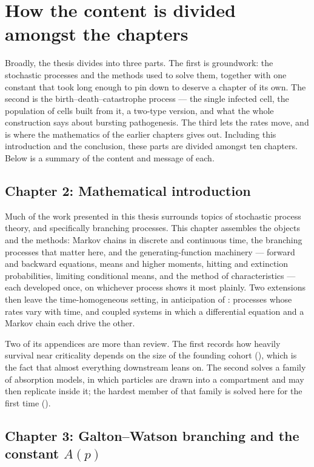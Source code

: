 \section{How the content is divided amongst the chapters}

Broadly, the thesis divides into three parts. The first is groundwork: the
stochastic processes and the methods used to solve them, together with one
constant that took long enough to pin down to deserve a chapter of its own.
The second is the birth--death--catastrophe process --- the single infected
cell, the population of cells built from it, a two-type version, and what the
whole construction says about bursting pathogenesis. The third lets the rates
move, and is where the mathematics of the earlier chapters gives out. Including
this introduction and the conclusion, these parts are divided amongst ten
chapters. Below is a summary of the content and message of each.

\subsection*{Chapter 2: Mathematical introduction}

Much of the work presented in this thesis surrounds topics of stochastic
process theory, and specifically branching processes. This chapter assembles
the objects and the methods: Markov chains in discrete and continuous time, the
branching processes that matter here, and the generating-function machinery ---
forward and backward equations, means and higher moments, hitting and
extinction probabilities, limiting conditional means, and the method of
characteristics --- each developed once, on whichever process shows it most
plainly. Two extensions then leave the time-homogeneous setting, in
anticipation of : processes whose rates vary
with time, and coupled systems in which a differential equation and a Markov
chain each drive the other.

Two of its appendices are more than review. The first records how heavily
survival near criticality depends on the size of the founding cohort
(), which is the fact that almost
everything downstream leans on. The second solves a family of absorption
models, in which particles are drawn into a compartment and may then replicate
inside it; the hardest member of that family is solved here for the first time
().

\subsection*{Chapter 3: Galton--Watson branching and the constant
\texorpdfstring{$A(p)$}{A(p)}}

